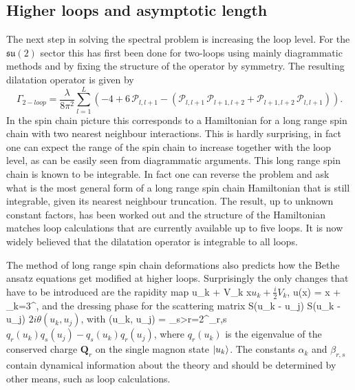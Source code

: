 \subsection{Higher loops and asymptotic length}

The next step in solving the spectral problem is increasing the loop level. 
For the $\mathfrak{su}(2)$ sector this has first been done for two-loops using mainly diagrammatic methods and by fixing the structure of the operator by symmetry. 
The resulting dilatation operator is given by \cite{su2_loops}
\begin{equation}
	\Gamma_{2-loop} = \frac{\lambda}{8\pi^2}\sum_{l=1}^L \left(-4 + 6 \, \mathcal{P}_{l,l+1} - \left( \mathcal{P}_{l,l+1} \, \mathcal{P}_{l+1,l+2} + \mathcal{P}_{l+1,l+2} \, \mathcal{P}_{l,l+1} \right) \right).
\end{equation}
In the spin chain picture this corresponds to a Hamiltonian for a long range spin chain with two nearest neighbour interactions. 
This is hardly surprising, in fact one can expect the range of the spin chain to increase together with the loop level, as can be easily seen from diagrammatic arguments.
This long range spin chain is known to be integrable.
In fact one can reverse the problem and ask what is the most general form of a long range spin chain Hamiltonian that is still integrable, given its nearest neighbour truncation. 
The result, up to unknown constant factors, has been worked out \cite{Bargheer:2009xy} and the structure of the Hamiltonian matches loop calculations that are currently available up to five loops. 
It is now widely believed that the dilatation operator is integrable to all loops.

The method of long range spin chain deformations also predicts how the Bethe ansatz equations get modified at higher loops. 
Surprisingly the only changes that have to be introduced are the rapidity map
\beq
	u_k +  V_k \rightarrow x\(u_k + \frac{i}{2} V_k\), \;\;\; u(x) = x + \sum_{k=3}^\infty {},
\eeq
and the dressing phase for the scattering matrix
\beq
	S(u_k - u_j) \rightarrow S(u_k - u_j) \exp\( 2i\theta(u_k, u_j) \),
\eeq
with
\beq
	\theta(u_k, u_j) = \sum_{s>r=2}^\infty \beta_{r,s} \( q_r(u_k)q_s(u_j) - q_s(u_k)q_r(u_j) \),
\eeq
where $q_r(u_k)$ is the eigenvalue of the conserved charge $\mathbf{Q}_r$ on the single magnon state $|u_k\rangle$.
The constants $\alpha_k$ and $\beta_{r,s}$ contain dynamical information about the theory and should be determined by other means, such as loop calculations.

